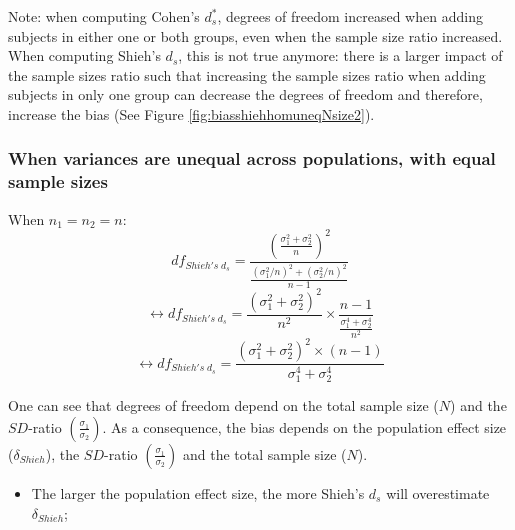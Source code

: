 \documentclass[
  english,
  man]{apa6}
\providecommand{\tightlist}{%
  \setlength{\itemsep}{0pt}\setlength{\parskip}{0pt}}
\begin{document}
Note: when computing Cohen's \(d^*_s\), degrees of freedom increased when adding subjects in either one or both groups, even when the sample size ratio increased. When computing Shieh's \(d_s\), this is not true anymore: there is a larger impact of the sample sizes ratio such that increasing the sample sizes ratio when adding subjects in only one group can decrease the degrees of freedom and therefore, increase the bias (See Figure \ref{fig:biasshiehhomuneqNsize2}).

\hypertarget{when-variances-are-unequal-across-populations-with-equal-sample-sizes-1}{%
\subsubsection{When variances are unequal across populations, with equal sample sizes}\label{when-variances-are-unequal-across-populations-with-equal-sample-sizes-1}}

When \(n_1=n_2=n\):
\[df_{Shieh's \; d_s} = \frac{\left( \frac{\sigma_1^2+\sigma_2^2}{n} \right)^2}{\frac{(\sigma_1^2/n)^2+(\sigma_2^2/n)^2}{n-1}}\]
\[\leftrightarrow df_{Shieh's \; d_s} = \frac{(\sigma_1^2+\sigma_2^2)^2}{n^2} \times\frac{n-1}{\frac{\sigma_1^4+\sigma_2^4}{n^2}}\]
\[\leftrightarrow df_{Shieh's \; d_s} = \frac{(\sigma_1^2+\sigma_2^2)^2 \times (n-1)}{\sigma_1^4+\sigma_2^4}\]

One can see that degrees of freedom depend on the total sample size (\(N\)) and the \(SD\)-ratio \(\left( \frac{\sigma_1}{\sigma_2}\right)\). As a consequence, the bias depends on the population effect size (\(\delta_{Shieh}\)), the \(SD\)-ratio \(\left( \frac{\sigma_1}{\sigma_2}\right)\) and the total sample size (\(N\)).

\begin{itemize}
\tightlist
\item
  The larger the population effect size, the more Shieh's \(d_s\) will overestimate \(\delta_{Shieh}\);
\end{itemize}
\end{document}

